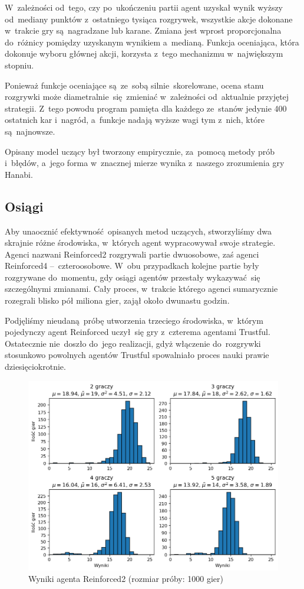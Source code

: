 \documentclass[declaration,shortabstract,inz]{iithesis}
\begin{document}
W~zależności od~tego, czy po~ukończeniu partii agent uzyskał wynik wyższy od~mediany punktów z~ostatniego tysiąca rozgrywek, wszystkie akcje dokonane w~trakcie gry są~nagradzane lub karane. Zmiana jest wprost proporcjonalna do~różnicy pomiędzy uzyskanym wynikiem a~medianą. Funkcja oceniająca, która dokonuje wyboru głównej akcji, korzysta z~tego mechanizmu w~największym stopniu.

Ponieważ funkcje oceniające są~ze~sobą silnie skorelowane, ocena stanu rozgrywki może diametralnie~się zmieniać w~zależności od~aktualnie przyjętej strategii. Z~tego powodu program pamięta dla każdego ze~stanów jedynie 400 ostatnich kar i~nagród, a~funkcje nadają wyższe wagi tym z~nich, które są~najnowsze.

Opisany model uczący był tworzony empirycznie, za~pomocą metody prób i~błędów, a~jego forma w~znacznej mierze wynika z~naszego zrozumienia gry Hanabi.

\subsection*{Osiągi}

Aby unaocznić efektywność opisanych metod uczących, stworzyliśmy dwa skrajnie różne środowiska, w~których agent wypracowywał swoje strategie. Agenci nazwani Reinforced2 rozgrywali partie dwuosobowe, zaś agenci Reinforced4 --~czteroosobowe. W~obu przypadkach kolejne partie były rozgrywane do~momentu, gdy osiągi agentów przestały wykazywać~się szczególnymi zmianami. Cały proces, w~trakcie którego agenci sumarycznie rozegrali blisko pół miliona gier, zajął około dwunastu godzin.

Podjęliśmy nieudaną próbę utworzenia trzeciego środowiska, w~którym pojedynczy agent Reinforced uczył~się gry z~czterema agentami Trustful. Ostatecznie nie~doszło do~jego realizacji, gdyż włączenie do~rozgrywki stosunkowo powolnych agentów Trustful spowalniało proces nauki prawie dziesięciokrotnie.

\begin{figure}[H]
	\centering
	\captionsetup{format=hang}
	\includegraphics[width=\textwidth,height=\textheight,keepaspectratio]{Reinforced2.png}
	\caption[Caption]{Wyniki agenta Reinforced2 (rozmiar próby: 1000 gier)}
	\label{fig:Reinforced2}
\end{figure}
\end{document}
